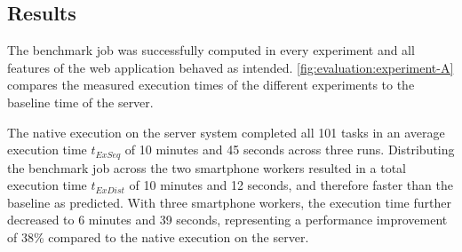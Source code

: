\subsection{Results}
The benchmark job was successfully computed in every experiment and all features of the web application behaved as intended. \autoref{fig:evaluation:experiment-A} compares the measured execution times of the different experiments to the baseline time of the server.

The native execution on the server system completed all 101 tasks in an average execution time $t_{ExSeq}$ of 10 minutes and 45 seconds across three runs. Distributing the benchmark job across the two smartphone workers resulted in a total execution time $t_{ExDist}$ of 10 minutes and 12 seconds, and therefore faster than the baseline as predicted. With three smartphone workers, the execution time further decreased to 6 minutes and 39 seconds, representing a performance improvement of 38\% compared to the native execution on the server.


